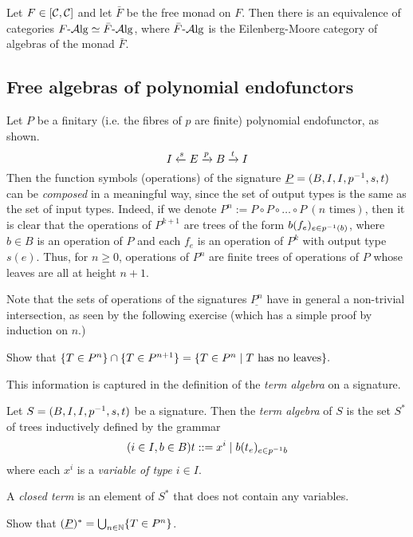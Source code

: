 \begin{proposition}
    Let $F\in\left[\mathcal{C},\mathcal{C}\right]$ and let $\bar{F}$ be the free monad on $F$. Then
    there is an equivalence of categories $F{\text{-} \mathrm{\mathcal{A} lg}}\simeq\bar{F}{\text{-} \mathrm{\mathcal{A} lg}}$, where
    $\bar{F}{\text{-} \mathrm{\mathcal{A} lg}}$ is the Eilenberg-Moore category of algebras of the monad
    $\bar{F}$.
\end{proposition}
\subsection{Free algebras of polynomial endofunctors}
Let $P$ be a finitary (i.e. the fibres of $p$ are finite) polynomial
endofunctor, as shown.
\[
    I\xleftarrow {s} E\xrightarrow {p} B\xrightarrow {t} I
\]
Then the function symbols (operations) of the signature
$\underline{P}=(B,I,I,p^{-1},s,t)$ can be \emph{composed} in a meaningful way,
since the set of output types is the same as the set of input types. Indeed, if
we denote $P^n:=P\circ P\circ\ldots\circ P \ (n \text{ times})$, then it is
clear that the operations of $P^{k+1}$ are trees of the form $b(f_e)_{e\in p^{-1}(b)}$,
where $b\in B$ is an operation of $P$ and each $f_e$ is an operation of $P^k$
with output type $s(e)$. Thus, for $n\geq 0$, operations of $P^n$ are finite
trees of operations of $P$ whose leaves are all at height $n+1$.

Note that the sets of operations of the signatures $\underline{P^n}$ have in
general a non-trivial intersection, as seen by the following exercise (which has
a simple proof by induction on $n$.)
\begin{exercise} Show that
        $\{ T\in P^n \} \cap \{ T\in P^{n+1} \} = \{ T\in P^n \mid T \text{ has
          no leaves} \}.$
\end{exercise}

This information is captured in the definition of the \emph{term algebra} on a
signature.
\begin{definition}
    Let $S=(B,I,I,p^{-1},s,t)$ be a signature. Then the \emph{term algebra} of
    $S$ is the set $S^*$ of trees inductively defined by the grammar
    \[
        (i\in I,b\in B) t ::= x^i \mid b(t_e)_{e\in p^{-1} b}
    \]
    where each $x^i$ is a \emph{variable of type $i\in I$}.

    A \emph{closed term} is an element of $S^*$ that does not contain any variables.
\end{definition}

\begin{exercise}
    Show that $(\underline{P})^*=\bigcup_{n\in\mathbb{N}} \{ T\in P^n \}$.
\end{exercise}


